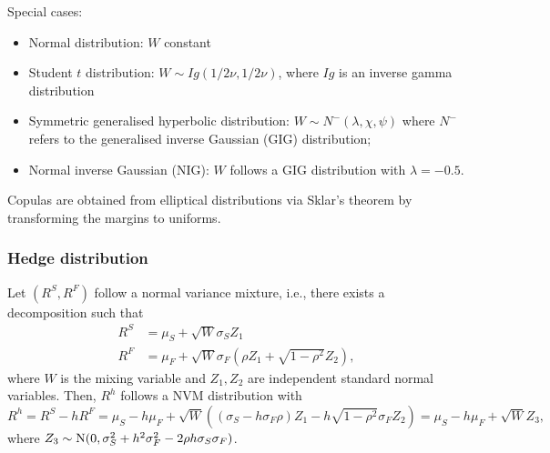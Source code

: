 Special cases:
\begin{itemize}
\item Normal distribution: $W$ constant
\item Student $t$ distribution: $W\sim \displaystyle Ig(1/2 \nu, 1/2
  \nu)$, where $Ig$ is an inverse gamma distribution
\item Symmetric generalised hyperbolic distribution: $W\sim
  N^{-}(\lambda, \chi, \psi)$ where $N^{-}$ refers to
  the generalised inverse Gaussian (GIG) distribution;
\item Normal inverse Gaussian (NIG): $W$ follows a GIG distribution
  with $\lambda=-0.5$.  
\end{itemize}

Copulas are obtained from elliptical distributions via Sklar's theorem
by transforming the margins to uniforms. 

\subsubsection*{Hedge distribution}
\label{sec:hedge-distribution-1}

Let $(R^S, R^F)$ follow a normal variance mixture, i.e., there exists a
decomposition such that
\begin{align*}
  R^S &=\mu_S + \sqrt{W} \sigma_S Z_1\\
  R^F &= \mu_F + \sqrt{W} \sigma_F (\rho Z_1 + \sqrt{1-\rho^2} Z_2),
\end{align*}
where $W$ is the mixing variable and $Z_1, Z_2$ are independent
standard normal variables. Then, $R^h$ follows a NVM distribution with
\begin{equation*}
  R^h = R^S - h R^F =  \mu_S - h \mu_F + \sqrt{W}
  \left((\sigma_S-h\sigma_F\rho)Z_1 -h \sqrt{1-\rho^2} 
    \sigma_F Z_2\right) = \mu_S - h \mu_F + \sqrt{W} Z_3,
\end{equation*}
where $Z_3\sim {\rm N}(0, \sigma_S^2 + h^2\sigma_F^2 - 2\rho
h\sigma_S \sigma_F)$. 

